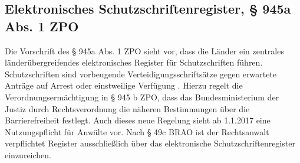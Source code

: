 \subsection*{Elektronisches Schutzschriftenregister, § 945a Abs. 1 ZPO}
Die Vorschrift des § 945a Abs. 1 ZPO sieht vor, dass die Länder ein zentrales länderübergreifendes elektronisches Register für Schutzschriften führen. Schutzschriften sind vorbeugende Verteidigungsschriftsätze gegen erwartete Anträge auf Arrest oder einstweilige Verfügung . Hierzu regelt die Verordnungsermächtigung in § 945 b ZPO, dass das Bundesministerium der Justiz durch Rechtsverordnung die näheren Bestimmungen über die Barrierefreiheit festlegt.
Auch dieses neue Regelung sieht ab 1.1.2017 eine Nutzungspflicht für Anwälte vor. Nach § 49c BRAO ist der Rechtsanwalt verpflichtet Register ausschließlich über das elektronische Schutzschriftenregister einzureichen.